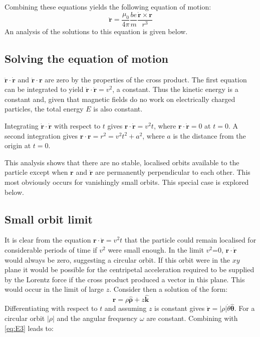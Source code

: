 \documentclass[twocolumn]{article}
\begin{document}
\noindent
Combining these equations yields the following equation of motion:
\begin{equation}
\label{eq:E3}
\mathbf {\ddot{r}} = \frac {\mu_0 }{4 \pi } \frac {be}{m}\frac {\mathbf{\dot{r}} \times \mathbf{r}    }{r^3}
\end{equation}
An analysis of the solutions to this equation is given below.
\subsection{Solving the equation of motion}
$\mathbf{\ddot{r}}\cdot{\mathbf{\dot{r}}}$ and $\mathbf{\ddot{r}}\cdot{\mathbf{r}}$ are zero by the properties of the cross product. The first equation can be integrated to yield  $\mathbf{\dot{r}}\cdot{\mathbf{\dot{r}}}= v^2$, a constant. Thus the kinetic energy is a constant and, given that magnetic fields do no work on electrically charged particles, the total energy $E$ is also constant.

Integrating $\mathbf{\dot{r}}\cdot{\mathbf{\dot{r}}} $ with respect to $t$ gives $\mathbf{{r}}\cdot{\mathbf{\dot{r}}}= v^2 t$, where $\mathbf{{r}}\cdot{\mathbf{\dot{r}}}=0$ at $t=0$. A second integration gives $\mathbf{{r}}\cdot{\mathbf{{r}}}=r^2= v^2 t^2 + a^2$, where $a$ is the distance from the origin at $t=0$.

This analysis shows that there are no stable, localised orbits available to the particle except when $\mathbf r $ and $\mathbf{\dot{r}}$ are permanently perpendicular to each other. This most obviously occurs for vanishingly small orbits. This special case is explored below.
\subsection{Small orbit limit}
It is clear from the equation $\mathbf{{r}}\cdot{\mathbf{\dot{r}}}= v^2 t$ that the particle could remain localised for considerable periods of time if $v^2$ were small enough. In the limit $v^2$=0, $\mathbf{{r}}\cdot{\mathbf{\dot{r}}} $ would always be zero, suggesting a circular orbit. If this orbit were in the $xy$ plane it would be possible for the centripetal acceleration required to be supplied by the Lorentz force if the cross product produced a vector in this plane. This would occur in the limit of large $z$.
\noindent
Consider then a solution of the form:
\begin{equation}
\label{eq:E4}
\mathbf {{r}} = \rho \mathbf{\hat \rho }+z \mathbf{\hat k}
\end{equation}
\noindent
Differentiating with respect to $t$ and assuming $z$ is constant gives
$\mathbf {\dot{r}} = |\rho| \dot{\theta}  \mathbf{ \hat \theta }$. For a circular orbit $|\rho|$ and the angular frequency $\omega$ are constant. Combining with \eqref{eq:E3} leads to:
\end{document}
